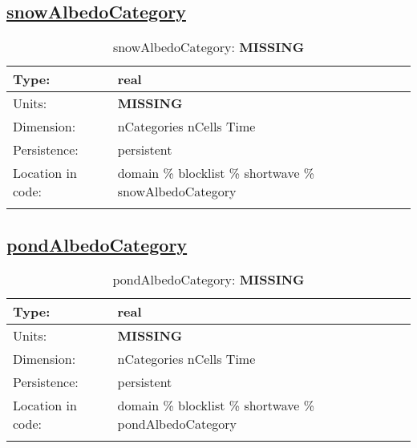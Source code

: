 \subsection[snowAlbedoCategory]{\hyperref[sec:var_tab_shortwave]{snowAlbedoCategory}}
\label{subsec:var_sec_shortwave_snowAlbedoCategory}
\begin{center}
\begin{longtable}{| p{2.0in} | p{4.0in} |}
        \hline 
        Type: & real \\
        \hline 
        Units: & {\bf \color{red} MISSING} \\
        \hline 
        Dimension: & nCategories nCells Time \\
        \hline 
        Persistence: & persistent \\
        \hline 
         Location in code: & domain \% blocklist \% shortwave \% snowAlbedoCategory \\
         \hline 
    \caption{snowAlbedoCategory: {\bf \color{red} MISSING}}
\end{longtable}
\end{center}
\subsection[pondAlbedoCategory]{\hyperref[sec:var_tab_shortwave]{pondAlbedoCategory}}
\label{subsec:var_sec_shortwave_pondAlbedoCategory}
\begin{center}
\begin{longtable}{| p{2.0in} | p{4.0in} |}
        \hline 
        Type: & real \\
        \hline 
        Units: & {\bf \color{red} MISSING} \\
        \hline 
        Dimension: & nCategories nCells Time \\
        \hline 
        Persistence: & persistent \\
        \hline 
         Location in code: & domain \% blocklist \% shortwave \% pondAlbedoCategory \\
         \hline 
    \caption{pondAlbedoCategory: {\bf \color{red} MISSING}}
\end{longtable}
\end{center}
